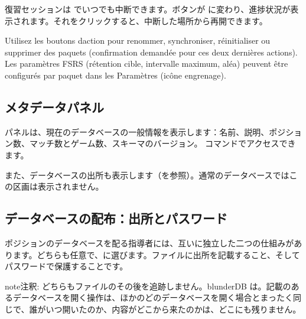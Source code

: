 \documentclass[letterpaper,10pt,dvipdfmx]{sphinxmanual}
\begin{document}
\sphinxAtStartPar
{} 復習セッションは  でいつでも中断できます。ボタンが  に変わり、進捗状況が表示されます。それをクリックすると、中断した場所から再開できます。

\sphinxAtStartPar
{} Utilisez les boutons d\textquotesingle{}action pour renommer,
synchroniser, réinitialiser ou supprimer des paquets (confirmation demandée
pour ces deux dernières actions). Les paramètres FSRS (rétention cible,
intervalle maximum, aléa) peuvent être configurés par paquet dans les
Paramètres (icône engrenage).


\subsection{メタデータパネル}
\label{\detokenize{manuel:panneau-metadonnees}}\label{\detokenize{manuel:panneau-metadata}}
\sphinxAtStartPar
{} パネルは、現在のデータベースの一般情報を表示します：名前、説明、ポジション数、マッチ数とゲーム数、スキーマのバージョン。 コマンドでアクセスできます。

\sphinxAtStartPar
また、データベースの出所も表示します（{\hyperref[\detokenize{manuel:diffusion-controlee}]{}}を参照）。通常のデータベースではこの区画は表示されません。


\subsection{データベースの配布：出所とパスワード}
\label{\detokenize{manuel:diffuser-une-base-origine-et-mot-de-passe}}\label{\detokenize{manuel:diffusion-controlee}}
\sphinxAtStartPar
ポジションのデータベースを配る指導者には、互いに独立した二つの仕組みがあります。どちらも任意で、に選びます。ファイルに出所を記載すること、そしてパスワードで保護することです。

\begin{sphinxadmonition}{note}{注釈:}
\sphinxAtStartPar
どちらもファイルのその後を追跡しません。blunderDB は。記載のあるデータベースを開く操作は、ほかのどのデータベースを開く場合とまったく同じで、誰がいつ開いたのか、内容がどこから来たのかは、どこにも残りません。
\end{sphinxadmonition}
\end{document}
